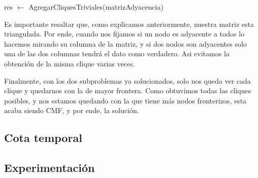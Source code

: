 \begin{algorithm}[H]
	\NoCaptionOfAlgo
	\caption{}
	res $\leftarrow$ AgregarCliquesTriviales(matrizAdyacencia)
	
\end{algorithm}

\begin{algorithm}[H]
	\NoCaptionOfAlgo
	\caption{}
\end{algorithm}

Es importante resaltar que, como explicamos anteriormente, nuestra matriz esta triangulada. Por ende, cuando nos fijamos si un nodo es adyacente a todos lo hacemos mirando su columna de la matriz, y si dos nodos son adyacentes solo una de las dos columnas tendrá el dato como verdadero. Asi evitamos la obtención de la misma clique varias veces.

Finalmente, con los dos subproblemas ya solucionados, solo nos queda ver cada clique y quedarnos con la de mayor frontera. Como obtuvimos todas las cliques posibles, y nos estamos quedando con la que tiene más nodos fronterizos, esta acaba siendo CMF, y por ende, la solución.

\subsection{Cota temporal}


\subsection{Experimentación}





